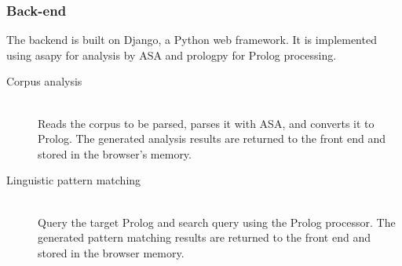 \subsubsection{Back-end}
The backend is built on Django, a Python web framework. It is implemented using asapy for analysis by ASA and prologpy for Prolog processing.

\begin{description}
\item[Corpus analysis]\mbox{}\\

Reads the corpus to be parsed, parses it with ASA, and converts it to Prolog.
The generated analysis results are returned to the front end and stored in the browser's memory.
\item[Linguistic pattern matching]\mbox{}\\
Query the target Prolog and search query using the Prolog processor.
The generated pattern matching results are returned to the front end and stored in the browser memory.
\end{description}


